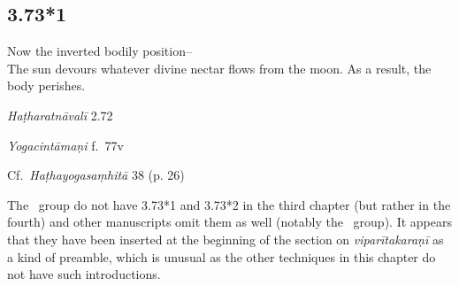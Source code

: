 \begin{ekdosis}
\subsection*{3.73*1}
\begin{translation}[hp03_073_1]
Now the inverted bodily position–\\
The sun devours whatever divine nectar flows from the moon. As a result, the body perishes.
\end{translation}


\begin{testimonia}[hp03_073_1]
\emph{Haṭharatnāvalī} 2.72 
\begin{versinnote}
\end{versinnote}
 
\emph{Yogacintāmaṇi} f.~77v
\begin{versinnote}
\end{versinnote}

Cf.~\emph{Haṭhayogasaṃhitā} 38 (p. 26)
\begin{versinnote}
\end{versinnote}
\end{testimonia}

\begin{philcomm}[hp03_073_1]
The \textalpha\ group do not have 3.73*1 and 3.73*2 in the third chapter (but rather in the fourth) and other manuscripts omit them as well (notably the \texteta\ group). It appears that they have been inserted at the beginning of the section on \emph{viparītakaraṇī} as a kind of preamble, which is unusual as the other techniques in this chapter do not have such introductions.


\end{philcomm}
\end{ekdosis}
